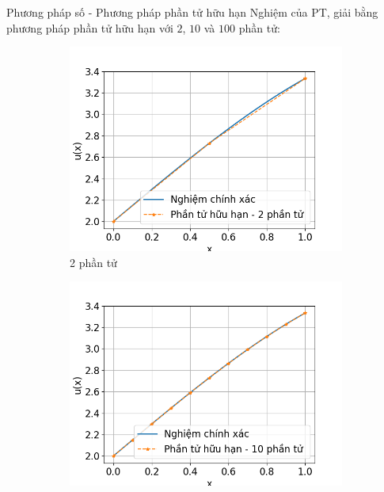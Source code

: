 \documentclass[aspectratio=169, t]{beamer} %
\begin{document}
\begin{frame}{Phương pháp số - Phương pháp phần tử hữu hạn}
\vspace{10mm}
Nghiệm của PT, giải bằng phương pháp phần tử hữu hạn với $2$, $10$ và $100$ phần tử:

\begin{figure}[htbp]
    \centering
    \begin{subfigure}[b]{0.3\linewidth}
        \centering
        \includegraphics[width=\linewidth]{Slides/Figure/PTHH_2el.png}
        \caption{2 phần tử}
    \end{subfigure}\hfill
    \begin{subfigure}[b]{0.3\linewidth}
        \centering
        \includegraphics[width=\linewidth]{Slides/Figure/PTHH_10el.png}

\end{subfigure}
\end{figure}
\end{frame}
\end{document}
